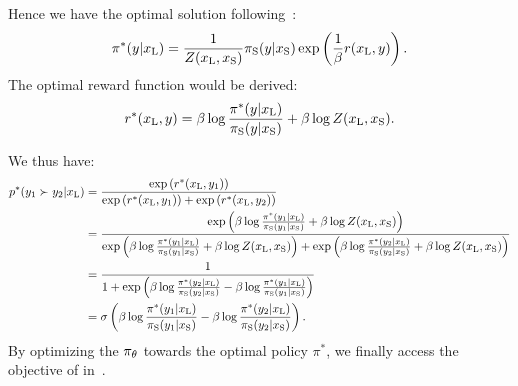 Hence we have the optimal solution following~\citet{Rafailov2023DirectPO}:
\begin{equation}
\pi^*(y|x_\text{L}) = \frac{1}{Z(x_\text{L}, x_\text{S})}\pi_\text{S}(y|x_\text{S})\exp\left(\frac{1}{\beta}r(x_\text{L}, y)\right).
\end{equation}
The optimal reward function would be derived:
\begin{equation}\label{eq:main_eq_restated}
    r^*(x_\text{L},y) =\beta \log \frac{\pi^*(y|x_\text{L})}{\pi_\text{S}(y|x_\text{S})} + \beta \log Z(x_\text{L}, x_\text{S}).
\end{equation}


We thus have:
\begin{align*}
    p^*(y_1\succ y_2|x_\text{L})&=\frac{\exp\left(r^*(x_\text{L}, y_1)\right)}{\exp\left(r^*(x_\text{L}, y_1)\right) + \exp\left(r^*(x_\text{L}, y_2)\right)} \\
    &=\frac{\exp\left(\beta \log \frac{\pi^*(y_1|x_\text{L})}{\pi_\text{S}(y_1|x_\text{S})} + \beta \log Z(x_\text{L}, x_\text{S})\right)}{\exp\left(\beta \log \frac{\pi^*(y_1|x_\text{L})}{\pi_\text{S}(y_1|x_\text{S})} + \beta \log Z(x_\text{L}, x_\text{S})\right) + \exp\left(\beta \log \frac{\pi^*(y_2|x_\text{L})}{\pi_\text{S}(y_2|x_\text{S})} + \beta \log Z(x_\text{L}, x_\text{S})\right)}\\ &=
    \frac{1}{1+\exp\left(\beta \log \frac{\pi^*(y_2|x_\text{L})}{\pi_\text{S}(y_2|x_\text{S})}-\beta \log \frac{\pi^*(y_1|x_\text{L})}{\pi_\text{S}(y_1|x_\text{S})}\right)} \\&= \sigma\left(\beta \log \frac{\pi^*(y_1|x_\text{L})}{\pi_\text{S}(y_1|x_\text{S})} - \beta \log \frac{\pi^*(y_2|x_\text{L})}{\pi_\text{S}(y_2|x_\text{S})}\right).
\end{align*}
By optimizing the $\pi_\theta$ towards the optimal policy $\pi^*$, we finally access the objective of \ourMethod{} in~.


